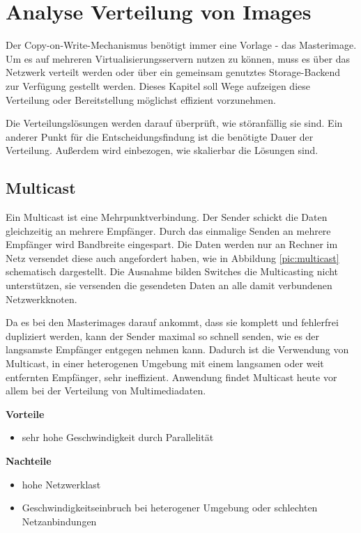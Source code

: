 \chapter{Analyse Verteilung von Images}\label{verteilung}
Der Copy-on-Write-Mechanismus benötigt immer eine Vorlage - das Masterimage. Um es auf mehreren Virtualisierungsservern nutzen zu können, muss es über das Netzwerk verteilt werden oder über ein gemeinsam genutztes Storage-Backend zur Verfügung gestellt werden. Dieses Kapitel soll Wege aufzeigen diese Verteilung oder Bereitstellung möglichst effizient vorzunehmen.

Die Verteilungslösungen werden darauf überprüft, wie störanfällig sie sind. Ein anderer Punkt für die Entscheidungsfindung ist die benötigte Dauer der Verteilung. Außerdem wird einbezogen, wie skalierbar die Lösungen sind.

\section{Multicast}
Ein Multicast ist eine Mehrpunktverbindung. Der Sender schickt die Daten gleichzeitig an mehrere Empfänger. Durch das einmalige Senden an mehrere Empfänger wird Bandbreite eingespart. Die Daten werden nur an Rechner im Netz versendet diese auch angefordert haben, wie in Abbildung \ref{pic:multicast} schematisch dargestellt. Die Ausnahme bilden Switches die Multicasting nicht unterstützen, sie versenden die gesendeten Daten an alle damit verbundenen Netzwerkknoten. 

Da es bei den Masterimages darauf ankommt, dass sie komplett und fehlerfrei dupliziert werden, kann der Sender maximal so schnell senden, wie es der langsamste Empfänger entgegen nehmen kann.  Dadurch ist die Verwendung von Multicast, in einer heterogenen Umgebung mit einem langsamen oder weit entfernten Empfänger, sehr ineffizient. Anwendung findet Multicast heute vor allem bei der Verteilung von Multimediadaten. 


\textbf{Vorteile}
\begin{itemize}
 \item sehr hohe Geschwindigkeit durch Parallelität
\end{itemize}

\textbf{Nachteile}
\begin{itemize}
 \item hohe Netzwerklast
 \item Geschwindigkeitseinbruch bei heterogener Umgebung oder schlechten Netzanbindungen
\end{itemize}

